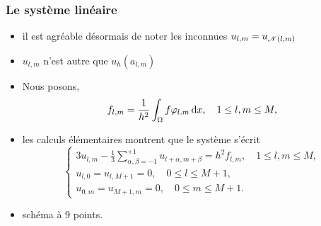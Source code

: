 \documentclass{beamer}
\def \de {{\rm d}}
\begin{document}
\begin{frame}
\frametitle{Le système linéaire}
\begin{itemize}
\item il est agréable désormais de noter les inconnues $u_{l,m}=u_{{\cal N}(l,m)}$
\item $u_{l,m}$ n'est autre que $u_h(a_{l,m})$


\item  Nous posons, 
\[
f_{l,m}=\frac 1{h^2}\int_{\Omega}f\varphi_{l,m}\,\de x,\quad 1\leq l,m\leq M,
\]
\item les calculs élémentaires montrent que le système s'écrit
\[
\left\{\begin{array}{l}
3u_{l,m}-\frac 13\sum_{\alpha,\beta=-1}^{+1}u_{l+\alpha,m+\beta}=h^2f_{l,m},\quad 1\leq l,m\leq M,\\
u_{l,0}=u_{l,M+1}=0,\quad 0\leq l\leq M+1,\\
u_{0,m}=u_{M+1,m}=0,\quad 0\leq m\leq M+1.
\end{array}\right.
\]
\item schéma à 9 points.
\end{itemize}


\end{frame}
\end{document}
